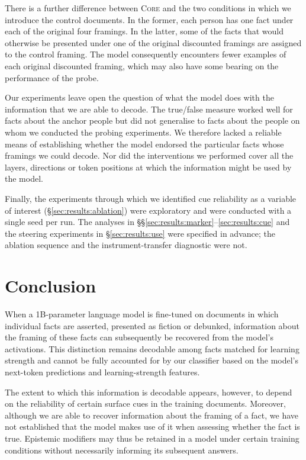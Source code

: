 \documentclass[10pt]{article}
\begin{document}
There is a further difference between \textsc{Core} and the two conditions in which we introduce the control documents. In the former, each person has one fact under each of the original four framings. In the latter, some of the facts that would otherwise be presented under one of the original discounted framings are assigned to the control framing. The model consequently encounters fewer examples of each original discounted framing, which may also have some bearing on the performance of the probe.

Our experiments leave open the question of what the model does with the information that we are able to decode. The true/false measure worked well for facts about the anchor people but did not generalise to facts about the people on whom we conducted the probing experiments. We therefore lacked a reliable means of establishing whether the model endorsed the particular facts whose framings we could decode. Nor did the interventions we performed cover all the layers, directions or token positions at which the information might be used by the model.

Finally, the experiments through which we identified cue reliability as a variable of interest (\S\ref{sec:results:ablation}) were exploratory and were conducted with a single seed per run. The analyses in \S\S\ref{sec:results:marker}--\ref{sec:results:cue} and the steering experiments in \S\ref{sec:results:use} were specified in advance; the ablation sequence and the instrument-transfer diagnostic were not.

\section{Conclusion}

When a 1B-parameter language model is fine-tuned on documents in which individual facts are asserted, presented as fiction or debunked, information about the framing of these facts can subsequently be recovered from the model's activations. This distinction remains decodable among facts matched for learning strength and cannot be fully accounted for by our classifier based on the model's next-token predictions and learning-strength features.

The extent to which this information is decodable appears, however, to depend on the reliability of certain surface cues in the training documents. Moreover, although we are able to recover information about the framing of a fact, we have not established that the model makes use of it when assessing whether the fact is true. Epistemic modifiers may thus be retained in a model under certain training conditions without necessarily informing its subsequent answers.
\end{document}
